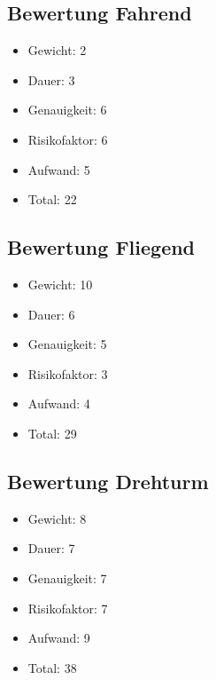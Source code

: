 \begin{landscape}
\subsection{Bewertung Fahrend}
\begin{itemize}
	\item Gewicht: 2
	\item Dauer: 3
	\item Genauigkeit: 6
	\item Risikofaktor: 6
	\item Aufwand: 5
	\item Total: 22
\end{itemize}

\subsection{Bewertung Fliegend}
\begin{itemize}
	\item Gewicht: 10
	\item Dauer: 6
	\item Genauigkeit: 5
	\item Risikofaktor: 3
	\item Aufwand: 4
	\item Total: 29
\end{itemize}

\subsection{Bewertung Drehturm}
\begin{itemize}
	\item Gewicht: 8
	\item Dauer: 7
	\item Genauigkeit: 7
	\item Risikofaktor: 7
	\item Aufwand: 9
	\item Total: 38
\end{itemize}


\end{landscape}
